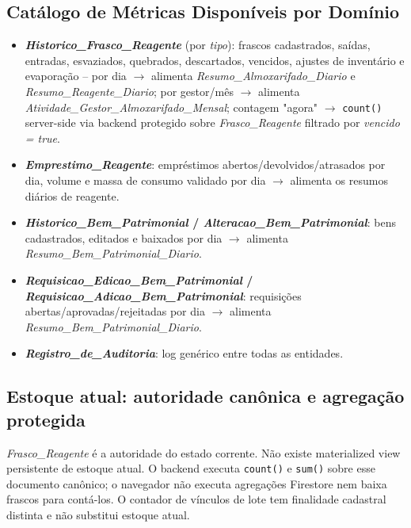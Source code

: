 \subsection{Catálogo de Métricas Disponíveis por Domínio}
\begin{itemize}
    \item \textbf{\textit{Historico\_Frasco\_Reagente}} (por \textit{tipo}): frascos cadastrados, saídas, entradas, esvaziados, quebrados, descartados, vencidos, ajustes de inventário e evaporação -- por dia $\rightarrow$ alimenta \textit{Resumo\_Almoxarifado\_Diario} e \textit{Resumo\_Reagente\_Diario}; por gestor/mês $\rightarrow$ alimenta \textit{Atividade\_Gestor\_Almoxarifado\_Mensal}; contagem "agora" $\rightarrow$ \texttt{count()} server-side via backend protegido sobre \textit{Frasco\_Reagente} filtrado por \textit{vencido = true}.
    \item \textbf{\textit{Emprestimo\_Reagente}}: empréstimos abertos/devolvidos/atrasados por dia, volume e massa de consumo validado por dia $\rightarrow$ alimenta os resumos diários de reagente.
    \item \textbf{\textit{Historico\_Bem\_Patrimonial} / \textit{Alteracao\_Bem\_Patrimonial}}: bens cadastrados, editados e baixados por dia $\rightarrow$ alimenta \textit{Resumo\_Bem\_Patrimonial\_Diario}.
    \item \textbf{\textit{Requisicao\_Edicao\_Bem\_Patrimonial} / \textit{Requisicao\_Adicao\_Bem\_Patrimonial}}: requisições abertas/aprovadas/rejeitadas por dia $\rightarrow$ alimenta \textit{Resumo\_Bem\_Patrimonial\_Diario}.
    \item \textbf{\textit{Registro\_de\_Auditoria}}: log genérico entre todas as entidades.
\end{itemize}

\subsection{Estoque atual: autoridade canônica e agregação protegida}
\label{sec:estoque-atual-cache}
\textit{Frasco\_Reagente} é a autoridade do estado corrente. Não existe materialized view persistente de estoque atual. O backend executa \texttt{count()} e \texttt{sum()} sobre esse documento canônico; o navegador não executa agregações Firestore nem baixa frascos para contá-los. O contador de vínculos de lote tem finalidade cadastral distinta e não substitui estoque atual.

